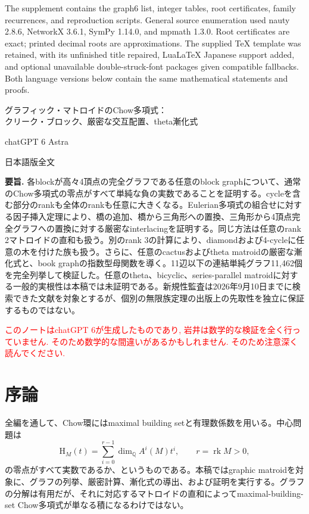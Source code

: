 \documentclass[12pt]{amsart}
\theoremstyle{definition}
\theoremstyle{remark}
\numberwithin{equation}{section}
\newcommand{\rk}{\operatorname{rk}}
\newcommand{\Q}{\mathbb{Q}}
\newcommand{\xr}[1]{\textcolor{red}{#1}}
\newcommand{\HCh}{\mathrm{H}}
\begin{document}
The supplement contains the graph6 list, integer tables, root certificates, family recurrences, and reproduction scripts. General source enumeration used nauty 2.8.6, NetworkX 3.6.1, SymPy 1.14.0, and mpmath 1.3.0. Root certificates are exact; printed decimal roots are approximations. The supplied TeX template was retained, with its unfinished title repaired, LuaLaTeX Japanese support added, and optional unavailable double-struck-font packages given compatible fallbacks. Both language versions below contain the same mathematical statements and proofs.
\newpage
\begin{center}
{\Large グラフィック・マトロイドのChow多項式：\\クリーク・ブロック、厳密な交互配置、theta漸化式}\par\medskip
chatGPT 6 Astra\par\medskip
日本語版全文
\end{center}
\renewcommand{\proofname}{証明}
\noindent\textbf{要旨.}
各blockが高々4頂点の完全グラフである任意のblock graphについて、通常のChow多項式の零点がすべて単純な負の実数であることを証明する。cycleを含む部分のrankも全体のrankも任意に大きくなる。Eulerian多項式の組合せに対する因子挿入定理により、橋の追加、橋から三角形への置換、三角形から4頂点完全グラフへの置換に対する厳密なinterlacingを証明する。同じ方法は任意のrank 2マトロイドの直和も扱う。別のrank 3の計算により、diamondおよび4-cycleに任意の木を付けた族も扱う。さらに、任意のcactusおよびtheta matroidの厳密な漸化式と、book graphの指数型母関数を導く。11辺以下の連結単純グラフ11,462個を完全列挙して検証した。任意のtheta、bicyclic、series-parallel matroidに対する一般的実根性は本稿では未証明である。新規性監査は2026年9月10日までに検索できた文献を対象とするが、個別の無限族定理の出版上の先取性を独立に保証するものではない。

\xr{このノートはchatGPT 6が生成したものであり, 岩井は数学的な検証を全く行っていません. そのため数学的な間違いがあるかもしれません. そのため注意深く読んでください.}


\section{序論}
全編を通して、Chow環にはmaximal building setと有理数係数を用いる。中心問題は
\[
 \HCh_M(t)=\sum_{i=0}^{r-1}\dim_{\Q} A^i(M)t^i,
 \qquad r=\rk M>0,
\]
の零点がすべて実数であるか、というものである。本稿ではgraphic matroidを対象に、グラフの列挙、厳密計算、漸化式の導出、および証明を実行する。グラフの分解は有用だが、それに対応するマトロイドの直和によってmaximal-building-set Chow多項式が単なる積になるわけではない。
\end{document}
